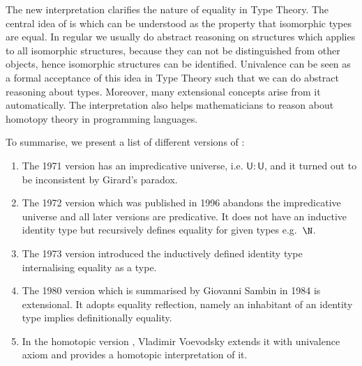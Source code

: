 



The new interpretation clarifies the nature of equality in Type Theory.
The central idea of \hott is  which can be understood as the property that isomorphic types are equal.
In regular \maths we usually do abstract reasoning on structures which applies to all isomorphic structures, because they can not be distinguished from other objects, hence isomorphic structures can be identified. Univalence can be seen as a formal acceptance of this idea in Type Theory such that we can do abstract reasoning about types. Moreover, many extensional concepts arise from it automatically. The interpretation also helps mathematicians to reason about homotopy theory in programming languages.


To summarise, we present a list of different versions of \mltt:

\begin{enumerate}

\item The 1971 version \cite{per:71} has an impredicative universe, i.e. $\mathsf{U} : \mathsf{U}$, and it turned out to be inconsistent by Girard's paradox.

\item The 1972 version which was published in 1996 \cite{Martin-Lof-1972} abandons the impredicative universe and all later versions are predicative. It does not have an inductive identity type but recursively defines equality for given types e.g.\ $\N$.

\item The 1973 version \cite{Martin-Lof-1973} introduced the inductively defined identity type internalising equality as a type.

\item The 1980 version which is summarised by Giovanni Sambin in 1984 \cite{martin1984intuitionistic} is extensional. It adopts equality reflection, namely an inhabitant of an identity type implies definitionally equality.

\item In the homotopic version \cite{hott}, Vladimir Voevodsky extends it with univalence axiom and provides a homotopic interpretation of it.

\end{enumerate}




